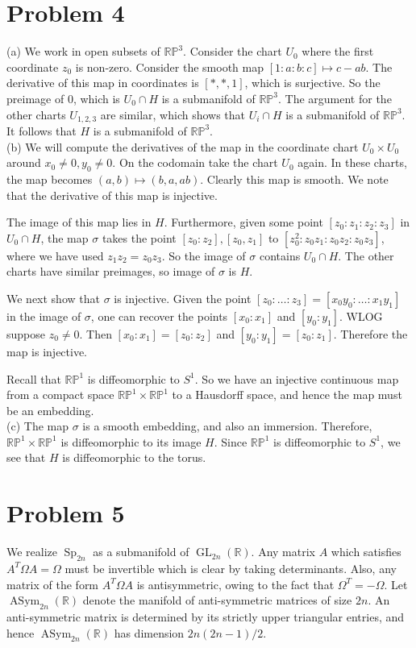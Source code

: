 \documentclass{amsart}
\numberwithin{equation}{section}
\theoremstyle{plain}
\theoremstyle{definition}
\theoremstyle{remark}
\renewcommand{\_}[2]{\underbrace{#1}_{#2}}
\renewcommand{\^}[2]{\overbrace{#1}_{#2}}
\newcommand{\R}{\mathbb{R}}
\renewcommand{\P}{\mathbb{P}}
\newcommand{\GL}{\operatorname{GL}}
\newcommand{\Sp}{\operatorname{Sp}}
\newcommand{\ASym}{\operatorname{ASym}}
\begin{document}
\section*{Problem 4}
(a) We work in open subsets of $\R\P^3$. Consider the chart $U_0$ where the first coordinate $z_0$ is non-zero. Consider the smooth map $[1:a:b:c] \mapsto c - ab$. The derivative of this map in coordinates is $[*, *, 1]$, which is surjective. So the preimage of $0$, which is $U_0\cap H$ is a submanifold of $\R\P^3$. The argument for the other charts $U_{1,2,3}$ are similar, which shows that $U_i\cap H$ is a submanifold of $\R\P^3$. It follows that $H$ is a submanifold of $\R\P^3$. \\

(b) We will compute the derivatives of the map in the coordinate chart $U_0 \times U_0$ around $x_0\neq 0, y_0 \neq 0$. On the codomain take the chart $U_0$ again. In these charts, the map becomes $(a,b) \mapsto (b,a,ab)$. Clearly this map is smooth. We note that the derivative of this map is injective.

The image of this map lies in $H$. Furthermore, given some point $[z_0: z_1: z_2: z_3]$ in $U_0 \cap H$, the map $\sigma$ takes the point $[z_0:z_2],[z_0,z_1]$ to $[z_0^2: z_0z_1:z_0z_2:z_0z_3]$, where we have used $z_1z_2 = z_0z_3$. So the image of $\sigma$ contains $U_0\cap H$. The other charts have similar preimages, so image of $\sigma$ is $H$.

We next show that $\sigma$ is injective. Given the point $[z_0:\dots:z_3] = [x_0y_0: \dots :x_1y_1]$ in the image of $\sigma$, one can recover the points $[x_0:x_1]$ and $[y_0:y_1]$. WLOG suppose $z_0 \neq 0$. Then $[x_0:x_1] = [z_0: z_2]$ and $[y_0:y_1] = [z_0:z_1]$. Therefore the map is injective.

Recall that $\R\P^1$ is diffeomorphic to $S^1$. So we have an injective continuous map from a compact space $\R\P^1 \times \R\P^1$ to a Hausdorff space, and hence the map must be an embedding.\\

(c) The map $\sigma$ is a smooth embedding, and also an immersion. Therefore, $\R\P^1\times \R\P^1$ is diffeomorphic to its image $H$. Since $\R\P^1$ is diffeomorphic to $S^1$, we see that $H$ is diffeomorphic to the torus.

\section*{Problem 5}

We realize $\Sp_{2n}$ as a submanifold of $\GL_{2n}(\R)$. Any matrix $A$ which satisfies $A^T\Omega A = \Omega$ must be invertible which is clear by taking determinants. Also, any matrix of the form $A^T\Omega A$ is antisymmetric, owing to the fact that $\Omega^T = -\Omega$. Let $\ASym_{2n}(\R)$ denote the manifold of anti-symmetric matrices of size $2n$. An anti-symmetric matrix is determined by its strictly upper triangular entries, and hence $\ASym_{2n}(\R)$ has dimension $2n(2n-1)/2$. \\
\end{document}
